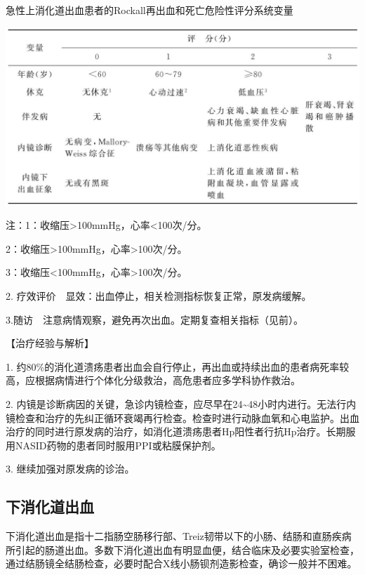 \begin{table}[htbp]
\begin{center}
\caption{急性上消化道出血患者的Rockall再出血和死亡危险性评分系统变量}
\label{tab3-22-3}
\includegraphics{./images/Image00118.jpg}
\end{center}

注：1：收缩压\textgreater{}100mmHg，心率\textless{}100次/分。

2：收缩压\textgreater{}100mmHg，心率\textgreater{}100次/分。

3：收缩压\textless{}100mmHg，心率\textgreater{}100次/分。

2. 疗效评价　显效：出血停止，相关检测指标恢复正常，原发病缓解。

3.随访　注意病情观察，避免再次出血。定期复查相关指标（见前）。
\end{table}



【治疗经验与解析】

1.
约80\%的消化道溃疡患者出血会自行停止，再出血或持续出血的患者病死率较高，应根据病情进行个体化分级救治，高危患者应多学科协作救治。

2.
内镜是诊断病因的关键，急诊内镜检查，应尽早在24\textasciitilde{}48小时内进行。无法行内镜检查和治疗的先纠正循环衰竭再行检查。检查时进行动脉血氧和心电监护。出血治疗的同时进行原发病的治疗，如消化道溃疡患者Hp阳性者行抗Hp治疗。长期服用NASID药物的患者同时服用PPI或粘膜保护剂。

3. 继续加强对原发病的诊治。

\subsection{下消化道出血}

下消化道出血是指十二指肠空肠移行部、Treiz韧带以下的小肠、结肠和直肠疾病所引起的肠道出血。多数下消化道出血有明显血便，结合临床及必要实验室检查，通过结肠镜全结肠检查，必要时配合X线小肠钡剂造影检查，确诊一般并不困难。

